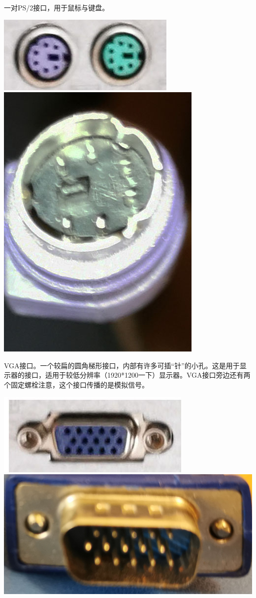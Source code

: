 一对PS/2接口，用于鼠标与键盘。
\begin{center}
	\includegraphics{pic/PS2}\includegraphics[scale=0.3]{pic/PS2L}
\end{center}\par
VGA接口。一个较扁的圆角梯形接口，内部有许多可插“针”的小孔。这是用于显示器的接口，适用于较低分辨率（1920*1200一下）显示器。VGA接口旁边还有两个固定螺栓注意，这个接口传播的是模拟信号。\begin{center}
	\includegraphics[scale=0.6]{pic/VGA}\includegraphics[scale=0.12]{pic/VGAL}
\end{center}\par
